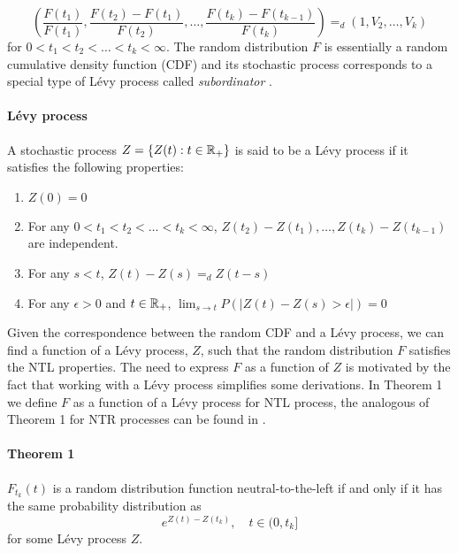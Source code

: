 \begin{equation}\label{increments_NTL_F}
\left(\frac{F(t_1)}{F(t_1)}, \frac{F(t_2) - F(t_1)}{F(t_2)}, \ldots, \frac{F(t_k) - F(t_{k-1})}{F(t_{k})} \right) =_d \left(1, V_2, \ldots, V_k\right)
\end{equation}
for $0 < t_1 < t_2 < \ldots < t_k < \infty$. The random distribution $F$ is essentially a random cumulative density function (CDF) and its stochastic process corresponds to a special type of L{\'e}vy process called \textit{subordinator} \cite{orbanz2012lecture}. 

\paragraph{L{\'e}vy process} \cite{papapantoleon2008introduction} A stochastic process $Z = \{Z(t) : t \in \mathbb{R}_+\}$ is said to be a L{\'e}vy process if it satisfies the following properties:
	\begin{enumerate}
		\item $Z(0) = 0$
		\item For any $0 < t_1 < t_2 < \ldots < t_k < \infty$, $Z(t_2) - Z(t_1), \ldots, Z(t_k) - Z(t_{k-1})$ are independent.
		\item For any $s < t$, $Z(t) - Z(s) =_d Z(t-s)$
		\item For any $\epsilon> 0$ and $t \in \mathbb{R}_{+}$, $\lim_{s \rightarrow t}P( |Z(t)-Z(s) > \epsilon|) = 0$
	\end{enumerate}

Given the correspondence between the random CDF and a L{\'e}vy process, we can find a function of a L{\'e}vy process, $Z$, such that the random distribution $F$ satisfies the NTL properties. The need to express $F$ as a function of $Z$ is motivated by the fact that working with a L{\'e}vy process simplifies some derivations. In Theorem 1 we define $F$ as a function of a L{\'e}vy process for NTL process, the analogous of Theorem 1 for NTR processes can be found in \cite{doksum1974tailfree}.

\paragraph{Theorem 1} $F_{t_k}(t)$ is a random distribution function neutral-to-the-left if and only if it has the same probability distribution as
\begin{equation}\label{NTL_eq}
e^{Z(t) - Z(t_k)}, \quad t \in (0, t_k]
\end{equation}
for some L{\'e}vy process $Z$.

